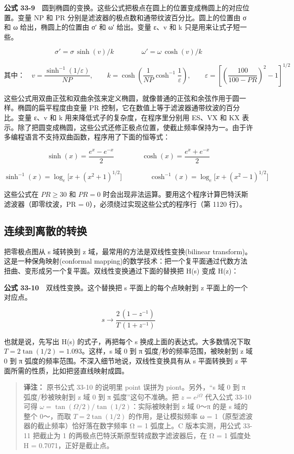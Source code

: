 \textbf{公式
33-9}　圆到椭圆的变换。这些公式把极点在圆上的位置变成椭圆上的对应位置。变量
NP 和 PR 分别是滤波器的极点数和通带纹波百分比。圆上的位置由 σ 和 ω
给出，椭圆上的位置由 σ′ 和 ω′ 给出。变量 ε、v 和 k
只是用来让式子短一些。

\[\sigma' = \sigma\,\sinh(v)/k \qquad\qquad \omega' = \omega\,\cosh(v)/k\]

\[\text{其中：}\quad v = \frac{\sinh^{-1}(1/\varepsilon)}{NP}, \qquad k = \cosh\!\left(\frac{1}{NP}\cosh^{-1}\frac{1}{\varepsilon}\right), \qquad \varepsilon = \left[\left(\frac{100}{100 - PR}\right)^{2} - 1\right]^{1/2}\]

这些公式用双曲正弦和双曲余弦来定义椭圆，就像普通的正弦和余弦作用于圆一样。椭圆的扁平程度由变量
PR 控制，它在数值上等于滤波器通带纹波的百分比。变量 ε、v 和 k
用来降低式子的复杂度，在程序里分别用 ES、VX 和 KX
表示。除了把圆变成椭圆，这些公式还修正极点位置，使截止频率保持为一。由于许多编程语言不支持双曲函数，程序用了下面的恒等式：

\[\sinh(x) = \frac{e^{x} - e^{-x}}{2} \qquad\qquad \cosh(x) = \frac{e^{x} + e^{-x}}{2}\]

\[\sinh^{-1}(x) = \log_e\!\big[x + (x^{2} + 1)^{1/2}\big] \qquad\qquad \cosh^{-1}(x) = \log_e\!\big[x + (x^{2} - 1)^{1/2}\big]\]

这些公式在 \(PR \ge 30\) 和 \(PR = 0\)
时会出现非法运算。要用这个程序计算巴特沃斯滤波器（即零纹波，PR =
0），必须绕过实现这些公式的程序行（第 1120 行）。

\subsection{连续到离散的转换}

把零极点图从 s 域转换到 z 域，最常用的方法是双线性变换(bilinear
transform)。这是一种保角映射(conformal
mapping)的数学技术：把一个复平面通过代数方法扭曲、变形成另一个复平面。双线性变换通过下面的替换把
H(s) 变成 H(z)：

\textbf{公式 33-10}　双线性变换。这个替换把 s 平面上的每个点映射到 z
平面上的一个对应点。

\[s \rightarrow \frac{2\,(1 - z^{-1})}{T\,(1 + z^{-1})}\]

也就是说，先写出 H(s) 的式子，再把每个 s
换成上面的表达式。大多数情况下取 \(T = 2\tan(1/2) = 1.093\)。这样，s 域
0 到 π 弧度/秒的频率范围，被映射到 z 域 0 到 π
弧度的频率范围。不深入细节地说，双线性变换具有从 s 平面转换到 z
平面所需的性质，比如把竖直线映射成圆。

\begin{quote}
\textbf{译注：} 原书公式 33-10 的说明里 point 误拼为 piont。另外，``s 域
0 到 π 弧度/秒被映射到 z 域 0 到 π 弧度''这句不准确。把
\(z = e^{j\Omega}\) 代入公式 33-10 可得
\(\omega = \tan(\Omega/2)/\tan(1/2)\)：实际被映射到 z 域 0～π 的是 s
域的整个 0～，而取 \(T = 2\tan(1/2)\) 的作用，是让模拟频率 ω =
1（原型滤波器的截止频率）恰好落在数字频率 Ω = 1 弧度上。C
版本实测，用公式 33-11 把截止为 1
的两极点巴特沃斯原型转成数字滤波器后，在 Ω = 1 弧度处
\textbar H\textbar{} = 0.7071，正好是截止点。
\end{quote}

